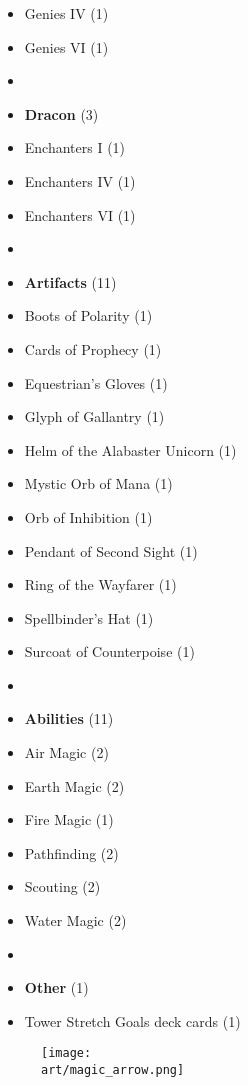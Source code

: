 \begin{multicols}{3}
\begin{itemize}[leftmargin=0pt, label={}, noitemsep]
  \item Genies IV (1)
  \item Genies VI (1)
  \item
  \item \textbf{Dracon} (3)
  \item Enchanters I (1)
  \item Enchanters IV (1)
  \item Enchanters VI (1)
  \item
  \item \textbf{Artifacts} (11)
  \item Boots of Polarity (1)
  \item Cards of Prophecy (1)
  \item Equestrian's Gloves (1)
  \item Glyph of Gallantry (1)
  \item Helm of the Alabaster Unicorn (1)
  \item Mystic Orb of Mana (1)
  \item Orb of Inhibition (1)
  \item Pendant of Second Sight (1)
  \item Ring of the Wayfarer (1)
  \item Spellbinder's Hat (1)
  \item Surcoat of Counterpoise (1)
  \item
  \item \textbf{Abilities} (11)
  \item Air Magic (2)
  \item Earth Magic (2)
  \item Fire Magic (1)
  \item Pathfinding (2)
  \item Scouting (2)
  \item Water Magic (2)
  \item
  \item \textbf{Other} (1)
  \item Tower Stretch Goals deck cards (1)
\end{itemize}

\end{multicols}

\vfill
\begin{figure*}[!hb]
  \centering
  \texttt{[image: \\art/magic\_arrow.png]}
\end{figure*}
\vfill
